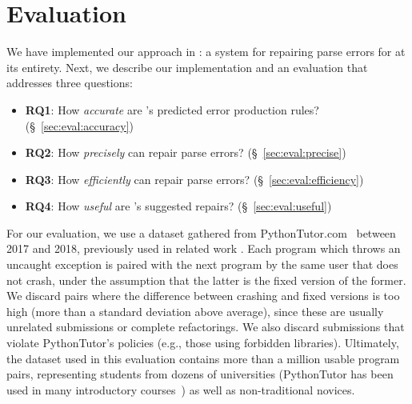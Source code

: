 \section{Evaluation}
\label{sec:eval}

We have implemented our approach in \toolname: a system for
repairing parse errors for \python at its entirety. Next,
we describe our implementation and an evaluation that addresses three
questions:

\begin{itemize}
    \item \textbf{RQ1}: How \emph{accurate} are \toolname's predicted error production rules?
                        (\S~\ref{sec:eval:accuracy})
    \item \textbf{RQ2}: How \emph{precisely} can \toolname repair parse errors?
                        (\S~\ref{sec:eval:precise})
    \item \textbf{RQ3}: How \emph{efficiently} can \toolname repair parse errors?
                        (\S~\ref{sec:eval:efficiency})
    \item \textbf{RQ4}: How \emph{useful} are \toolname's suggested repairs?
                        (\S~\ref{sec:eval:useful})

\end{itemize}


%
For our evaluation, we use a \python dataset gathered from
PythonTutor.com~\citep{Guo2013} between 2017 and 2018, previously used in
related work \citep{Endres2019,Cosman2020}. Each program which throws an
uncaught \python exception is paired with the next program by the same user that
does not crash, under the assumption that the latter is the fixed version of the
former. We discard pairs where the difference between crashing and fixed
versions is too high (more than a standard deviation above average), since these
are usually unrelated submissions or complete refactorings. We also discard
submissions that violate PythonTutor's policies (e.g., those using forbidden
libraries). Ultimately, the dataset used in this evaluation contains more than a
million usable program pairs, representing students from dozens of universities
(PythonTutor has been used in many introductory courses~\citep{Guo2013}) as well
as non-traditional novices.


